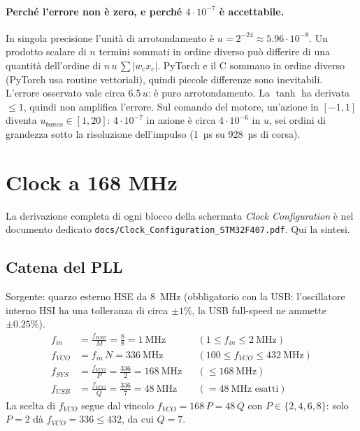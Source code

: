\documentclass[11pt,a4paper]{article}
\newcommand{\code}[1]{\texttt{\small #1}}
\begin{document}
\paragraph{Perché l'errore non è zero, e perché $4\cdot10^{-7}$ è accettabile.}
In singola precisione l'unità di arrotondamento è $u = 2^{-24} \approx 5.96\cdot10^{-8}$.
Un prodotto scalare di $n$ termini sommati in ordine diverso può differire di una quantità dell'ordine
di $n\,u\,\sum|w_c x_c|$. PyTorch e il C sommano in ordine diverso (PyTorch usa routine vettoriali), quindi
piccole differenze sono inevitabili. L'errore osservato vale circa $6.5\,u$: è puro arrotondamento.
La $\tanh$ ha derivata $\le 1$, quindi non amplifica l'errore. Sul comando del motore,
un'azione in $[-1,1]$ diventa $u_{banco}\in[1,20]$: $4\cdot10^{-7}$ in azione è circa
$4\cdot10^{-6}$ in $u$, sei ordini di grandezza sotto la risoluzione dell'impulso (1~µs su 928~µs di corsa).

\section{Clock a 168 MHz}

La derivazione completa di ogni blocco della schermata \emph{Clock Configuration} è nel documento
dedicato \code{docs/Clock\_Configuration\_STM32F407.pdf}. Qui la sintesi.

\subsection{Catena del PLL}
Sorgente: quarzo esterno HSE da 8~MHz (obbligatorio con la USB: l'oscillatore interno HSI ha una
tolleranza di circa $\pm1\%$, la USB full-speed ne ammette $\pm0.25\%$).
\begin{align}
f_{in}  &= \frac{f_{HSE}}{M} = \frac{8}{8} = 1\ \text{MHz} && (1 \le f_{in} \le 2\ \text{MHz})\\
f_{VCO} &= f_{in}\, N = 336\ \text{MHz} && (100 \le f_{VCO} \le 432\ \text{MHz})\\
f_{SYS} &= \frac{f_{VCO}}{P} = \frac{336}{2} = 168\ \text{MHz} && (\le 168\ \text{MHz})\\
f_{USB} &= \frac{f_{VCO}}{Q} = \frac{336}{7} = 48\ \text{MHz} && (= 48\ \text{MHz esatti})
\end{align}
La scelta di $f_{VCO}$ segue dal vincolo $f_{VCO} = 168\,P = 48\,Q$ con $P\in\{2,4,6,8\}$:
solo $P=2$ dà $f_{VCO}=336 \le 432$, da cui $Q=7$.
\end{document}
